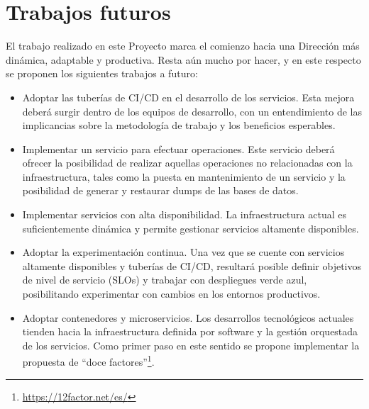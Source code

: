\section{Trabajos futuros}
%
El trabajo realizado en este Proyecto marca el comienzo hacia una
Dirección más dinámica, adaptable y productiva. Resta aún mucho por
hacer, y en este respecto se proponen los siguientes trabajos a
futuro:
%
\begin{itemize}
\item Adoptar las tuberías de CI/CD en el desarrollo de los
  servicios. Esta mejora deberá surgir dentro de los equipos de
  desarrollo, con un entendimiento de las implicancias sobre la
  metodología de trabajo y los beneficios esperables.
\item Implementar un servicio para efectuar operaciones. Este servicio
  deberá ofrecer la posibilidad de realizar aquellas operaciones no
  relacionadas con la infraestructura, tales como la puesta en
  mantenimiento de un servicio y la posibilidad de generar y restaurar
  dumps de las bases de datos.
\item Implementar servicios con alta disponibilidad. La
  infraestructura actual es suficientemente dinámica y permite
  gestionar servicios altamente disponibles.
\item Adoptar la experimentación continua. Una vez que se cuente con
  servicios altamente disponibles y tuberías de CI/CD, resultará
  posible definir objetivos de nivel de servicio (SLOs) y trabajar con
  despliegues verde azul, posibilitando experimentar con cambios en
  los entornos productivos.
\item Adoptar contenedores y microservicios. Los desarrollos
  tecnológicos actuales tienden hacia la infraestructura definida por
  software y la gestión orquestada de los servicios. Como primer paso
  en este sentido se propone implementar la propuesta de ``doce
  factores''\footnote{\url{https://12factor.net/es/}}.
\end{itemize}
